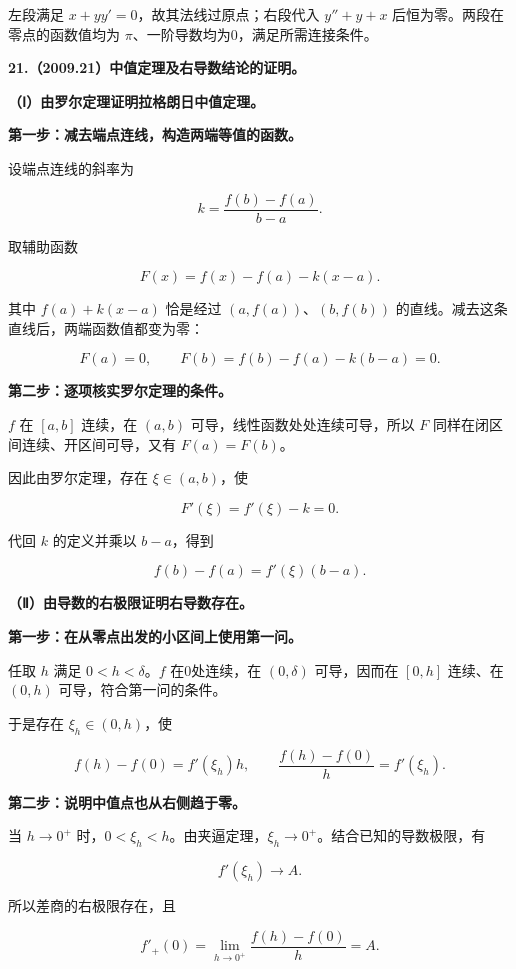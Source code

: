 \documentclass[UTF8,11pt,fontset=windows]{ctexart}
\begin{document}
左段满足 $x+yy'=0$，故其法线过原点；右段代入 $y''+y+x$ 后恒为零。两段在零点的函数值均为 $\pi$、一阶导数均为0，满足所需连接条件。

\clearpage

\textbf{21.（2009.21）中值定理及右导数结论的证明。}

\textbf{（Ⅰ）由罗尔定理证明拉格朗日中值定理。}

\textbf{第一步：减去端点连线，构造两端等值的函数。}

设端点连线的斜率为

$$
k=\frac{f(b)-f(a)}{b-a}.
$$

取辅助函数

$$
F(x)=f(x)-f(a)-k(x-a).
$$

其中 $f(a)+k(x-a)$ 恰是经过 $(a,f(a))$、$(b,f(b))$ 的直线。减去这条直线后，两端函数值都变为零：

$$
F(a)=0,
\qquad F(b)=f(b)-f(a)-k(b-a)=0.
$$

\textbf{第二步：逐项核实罗尔定理的条件。}

$f$ 在 $[a,b]$ 连续，在 $(a,b)$ 可导，线性函数处处连续可导，所以 $F$ 同样在闭区间连续、开区间可导，又有 $F(a)=F(b)$。

因此由罗尔定理，存在 $\xi\in(a,b)$，使

$$
F'(\xi)=f'(\xi)-k=0.
$$

代回 $k$ 的定义并乘以 $b-a$，得到

$$
\boxed{f(b)-f(a)=f'(\xi)(b-a)}.
$$

\textbf{（Ⅱ）由导数的右极限证明右导数存在。}

\textbf{第一步：在从零点出发的小区间上使用第一问。}

任取 $h$ 满足 $0<h<\delta$。$f$ 在0处连续，在 $(0,\delta)$ 可导，因而在 $[0,h]$ 连续、在 $(0,h)$ 可导，符合第一问的条件。

于是存在 $\xi_h\in(0,h)$，使

$$
f(h)-f(0)=f'(\xi_h)h,
\qquad \frac{f(h)-f(0)}h=f'(\xi_h).
$$

\textbf{第二步：说明中值点也从右侧趋于零。}

当 $h\to0^+$ 时，$0<\xi_h<h$。由夹逼定理，$\xi_h\to0^+$。结合已知的导数极限，有

$$
f'(\xi_h)\longrightarrow A.
$$

所以差商的右极限存在，且

$$
\boxed{f'_+(0)=\lim_{h\to0^+}\frac{f(h)-f(0)}h=A}.
$$
\end{document}
